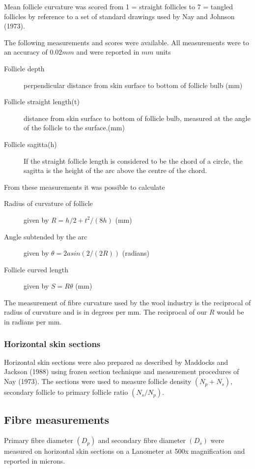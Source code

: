 \documentclass{article}
\begin{document}
 Mean follicle curvature was scored from 1 = straight follicles to 7 = tangled follicles by reference to a set of standard drawings used by Nay and Johnson (1973).  

The following measurements and scores were available.  All measurements were to an accuracy of $0.02mm$ and were reported in $mm$ units
\begin{description}
\item[Follicle depth] perpendicular distance from skin surface to bottom of follicle bulb (mm)
\item[Follicle straight length(t)] distance from skin surface to bottom of follicle bulb, measured at the angle of the follicle to the surface.(mm)
\item[Follicle sagitta(h)] If the straight follicle length is considered to be the chord of a circle, the sagitta is the height of the arc above the centre of the chord.
\end{description}

From these measurements it was possible to calculate
\begin{description}
\item[Radius of curvature of follicle]  given by $R = h/2 + t^{2}/(8h)$ (mm)
\item[Angle subtended by the arc] given by $\theta = 2 asin(2/(2R))$ (radians)
\item[Follicle curved length] given by $S = R \theta$ (mm)
\end{description}

The measurement of fibre curvature used by the wool industry is the reciprocal of radius of curvature and is in degrees per mm. The reciprocal of our $R$ would be in radians per mm.


\subsubsection{Horizontal skin sections}
Horizontal skin sections were also prepared as described by
Maddocks and Jackson (1988) using frozen section technique and
measurement procedures of Nay (1973). The sections were used to measure
follicle density $(N_{p} + N_{s})$, secondary follicle to primary follicle ratio $(N_{s}/N_{p})$.
 
\subsection{Fibre measurements}
Primary fibre diameter $(D_{p})$ and secondary fibre diameter $(D_{s})$ were measured on horizontal skin sections on a Lanometer at 500x magnification and reported in microns.
\end{document}
